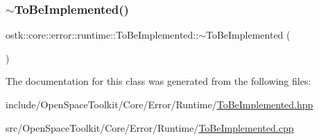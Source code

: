 \mbox{\label{classostk_1_1core_1_1error_1_1runtime_1_1_to_be_implemented_a3383ca49c74c4969cda170c12ecff4a9}} 
\subsubsection{\texorpdfstring{$\sim$\+To\+Be\+Implemented()}{~ToBeImplemented()}}
{\footnotesize\ttfamily ostk\+::core\+::error\+::runtime\+::\+To\+Be\+Implemented\+::$\sim$\+To\+Be\+Implemented (\begin{DoxyParamCaption}{ }\end{DoxyParamCaption})}



The documentation for this class was generated from the following files\+:\begin{DoxyCompactItemize}
\item 
include/\+Open\+Space\+Toolkit/\+Core/\+Error/\+Runtime/\hyperlink{_to_be_implemented_8hpp}{To\+Be\+Implemented.\+hpp}\item 
src/\+Open\+Space\+Toolkit/\+Core/\+Error/\+Runtime/\hyperlink{_to_be_implemented_8cpp}{To\+Be\+Implemented.\+cpp}\end{DoxyCompactItemize}
